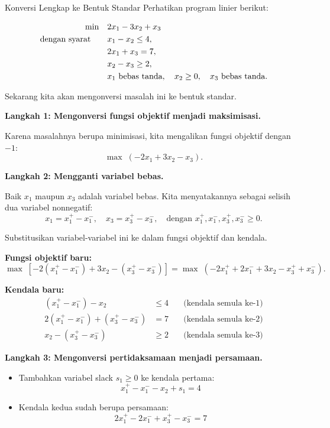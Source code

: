 \begin{example}{Konversi Lengkap ke Bentuk Standar}
Perhatikan program linier berikut:

\[
\begin{aligned}
\min \quad & 2x_1 - 3x_2 + x_3 \\
\mbox{dengan syarat}\quad \quad 
& x_1 - x_2 \leq 4, \\
& 2x_1 + x_3 = 7, \\
& x_2 - x_3 \geq 2, \\
& x_1 \mbox{ bebas tanda}, \quad x_2 \geq 0, \quad x_3 \mbox{ bebas tanda}.
\end{aligned}
\]

Sekarang kita akan mengonversi masalah ini ke bentuk standar.

\medskip
\textbf{Langkah 1: Mengonversi fungsi objektif menjadi maksimisasi.}

Karena masalahnya berupa minimisasi, kita mengalikan fungsi objektif dengan \( -1 \):
\[
\max \; (-2x_1 + 3x_2 - x_3).
\]

\medskip
\textbf{Langkah 2: Mengganti variabel bebas.}

Baik \( x_1 \) maupun \( x_3 \) adalah variabel bebas. Kita menyatakannya sebagai selisih dua variabel nonnegatif:
\[
x_1 = x_1^+ - x_1^-, \quad x_3 = x_3^+ - x_3^-, \quad \text{dengan } x_1^+, x_1^-, x_3^+, x_3^- \geq 0.
\]

Substitusikan variabel-variabel ini ke dalam fungsi objektif dan kendala.

\smallskip
\textbf{Fungsi objektif baru:}
\[
\max \; [-2(x_1^+ - x_1^-) + 3x_2 - (x_3^+ - x_3^-)] = \max \; (-2x_1^+ + 2x_1^- + 3x_2 - x_3^+ + x_3^-).
\]

\smallskip
\textbf{Kendala baru:}
\begin{align*}
(x_1^+ - x_1^-) - x_2 &\leq 4 \quad &\text{(kendala semula ke-1)} \\
2(x_1^+ - x_1^-) + (x_3^+ - x_3^-) &= 7 \quad &\text{(kendala semula ke-2)} \\
x_2 - (x_3^+ - x_3^-) &\geq 2 \quad &\text{(kendala semula ke-3)}
\end{align*}

\medskip
\textbf{Langkah 3: Mengonversi pertidaksamaan menjadi persamaan.}

\begin{itemize}
    \item Tambahkan variabel slack \( s_1 \geq 0 \) ke kendala pertama:
    \[
    x_1^+ - x_1^- - x_2 + s_1 = 4
    \]

    \item Kendala kedua sudah berupa persamaan:
    \[
    2x_1^+ - 2x_1^- + x_3^+ - x_3^- = 7
    \]


\end{itemize}
\end{example}
